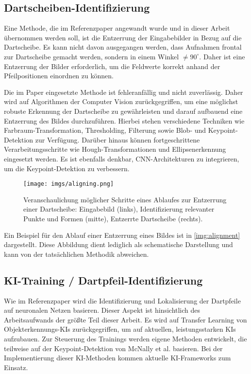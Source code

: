 \subsection{Dartscheiben-Identifizierung}
\label{sec:methodik:dartscheibe}

Eine Methode, die im Referenzpaper angewandt wurde und in dieser Arbeit übernommen werden soll, ist die Entzerrung der Eingabebilder in Bezug auf die Dartscheibe. Es kann nicht davon ausgegangen werden, dass Aufnahmen frontal zur Dartscheibe gemacht werden, sondern in einem Winkel $\neq90^\circ$. Daher ist eine Entzerrung der Bilder erforderlich, um die Feldwerte korrekt anhand der Pfeilpositionen einordnen zu können.

Die im Paper eingesetzte Methode ist fehleranfällig und nicht zuverlässig. Daher wird auf Algorithmen der Computer Vision zurückgegriffen, um eine möglichst robuste Erkennung der Dartscheibe zu gewährleisten und darauf aufbauend eine Entzerrung des Bildes durchzuführen. Hierbei stehen verschiedene Techniken wie Farbraum-Transformation, Thresholding, Filterung sowie Blob- und Keypoint-Detektion zur Verfügung. Darüber hinaus können fortgeschrittene Verarbeitungsschritte wie Hough-Transformationen und Ellipsenerkennung eingesetzt werden. Es ist ebenfalls denkbar, CNN-Architekturen zu integrieren, um die Keypoint-Detektion zu verbessern.

\begin{figure}
    \centering
    \texttt{[image: imgs/aligning.png]}
    \caption{Veranschaulichung möglicher Schritte eines Ablaufes zur Entzerrung einer Dartscheibe: Eingabebild (links), Identifizierung relevanter Punkte und Formen (mitte), Entzerrte Dartscheibe (rechts).}
    \label{img:alignment}
\end{figure}

Ein Beispiel für den Ablauf einer Entzerrung eines Bildes ist in \autoref{img:alignment} dargestellt. Diese Abbildung dient lediglich als schematische Darstellung und kann von der tatsächlichen Methodik abweichen.

\subsection{KI-Training / Dartpfeil-Identifizierung}
\label{sec:methodik:ki}

Wie im Referenzpaper wird die Identifizierung und Lokalisierung der Dartpfeile auf neuronalen Netzen basieren. Dieser Aspekt ist hinsichtlich des Arbeitsaufwands der größte Teil dieser Arbeit. Es wird auf Transfer Learning von Objekterkennungs-KIs zurückgegriffen, um auf aktuellen, leistungsstarken KIs aufzubauen. Zur Steuerung des Trainings werden eigene Methoden entwickelt, die teilweise auf der Keypoint-Detektion von McNally et al. basieren. Bei der Implementierung dieser KI-Methoden kommen aktuelle KI-Frameworks zum Einsatz.

